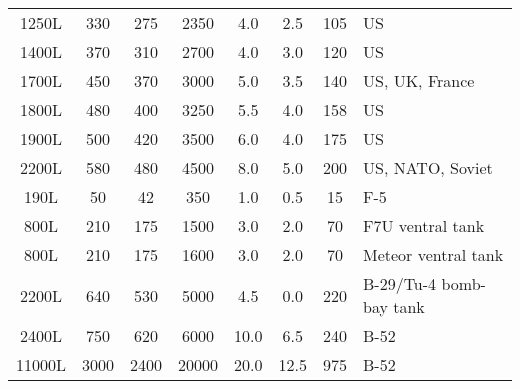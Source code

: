 \begin{twocolumntablefloat}
\begin{twocolumntable}
{\begin{tabular}{cccccccl}
\phantom{0}1250L&\phantom{0}330&\phantom{0}275&\phantom{0}2350&\phantom{0}4.0&\phantom{0}2.5&\phantom{}105&US\\
\phantom{0}1400L&\phantom{0}370&\phantom{0}310&\phantom{0}2700&\phantom{0}4.0&\phantom{0}3.0&\phantom{}120&US\\
\phantom{0}1700L&\phantom{0}450&\phantom{0}370&\phantom{0}3000&\phantom{0}5.0&\phantom{0}3.5&\phantom{}140&US, UK, France\\
\phantom{0}1800L&\phantom{0}480&\phantom{0}400&\phantom{0}3250&\phantom{0}5.5&\phantom{0}4.0&\phantom{}158&US\\
\phantom{0}1900L&\phantom{0}500&\phantom{0}420&\phantom{0}3500&\phantom{0}6.0&\phantom{0}4.0&\phantom{}175&US\\
\phantom{0}2200L&\phantom{0}580&\phantom{0}480&\phantom{0}4500&\phantom{0}8.0&\phantom{0}5.0&\phantom{}200&US, NATO, Soviet\\
\midrule
\phantom{00}190L&\phantom{00}50&\phantom{00}42&\phantom{00}350&\phantom{0}1.0&\phantom{0}0.5&\phantom{0}15&F-5\\
\phantom{00}800L&\phantom{0}210&\phantom{0}175&\phantom{0}1500&\phantom{0}3.0&\phantom{0}2.0&\phantom{0}70&F7U ventral tank\\
\phantom{00}800L&\phantom{0}210&\phantom{0}175&\phantom{0}1600&\phantom{0}3.0&\phantom{0}2.0&\phantom{0}70&Meteor ventral tank\\
\phantom{0}2200L&\phantom{0}640&\phantom{0}530&\phantom{0}5000&\phantom{0}4.5&\phantom{0}0.0&\phantom{0}220&B-29/Tu-4 bomb-bay tank\\
\phantom{0}2400L&\phantom{0}750&\phantom{0}620&\phantom{0}6000&\phantom{}10.0&\phantom{0}6.5&\phantom{0}240&B-52\\
\phantom{}11000L&\phantom{}3000&\phantom{}2400&\phantom{}20000&\phantom{}20.0&12.5&\phantom{0}975&B-52\\
\bottomrule
\end{tabular}

}
\end{twocolumntable}
\end{twocolumntablefloat}